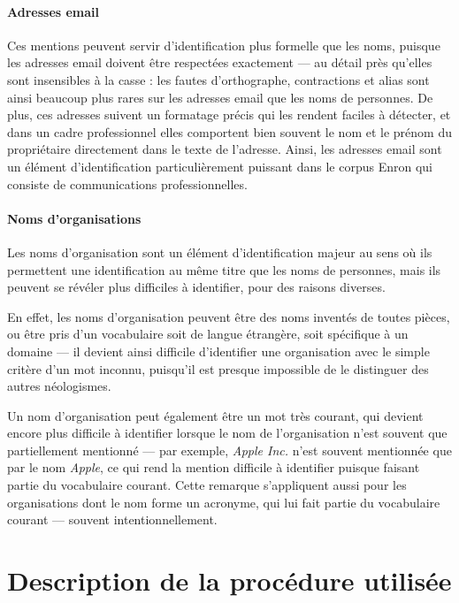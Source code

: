 \documentclass[11pt]{article}
\begin{document}
\paragraph{Adresses email}

Ces mentions peuvent servir d'identification plus formelle que les noms, puisque
les adresses email doivent être respectées exactement --- au détail près
qu'elles sont insensibles à la casse : les fautes d'orthographe, contractions
et alias sont ainsi beaucoup plus rares sur les adresses email que les noms
de personnes. De plus, ces adresses suivent un formatage précis qui les rendent
faciles à détecter, et dans un cadre professionnel elles comportent bien souvent
le nom et le prénom du propriétaire directement dans le texte de l'adresse.
Ainsi, les adresses email sont un élément d'identification particulièrement
puissant dans le corpus Enron qui consiste de communications professionnelles.

\paragraph{Noms d'organisations}

Les noms d'organisation sont un élément d'identification majeur au sens où ils
permettent une identification au même titre que les noms de personnes, mais ils
peuvent se révéler plus difficiles à identifier, pour des raisons diverses.

En effet, les noms d'organisation peuvent être des noms inventés de toutes
pièces, ou être pris d'un vocabulaire soit de langue étrangère, soit spécifique
à un domaine --- il devient ainsi difficile d'identifier une organisation avec
le simple critère d'un mot inconnu, puisqu'il est presque impossible de le
distinguer des autres néologismes.

Un nom d'organisation peut également être un mot très courant, qui devient
encore plus difficile à identifier lorsque le nom de l'organisation n'est
souvent que partiellement mentionné --- par exemple, \textit{Apple Inc.} n'est
souvent mentionnée que par le nom \textit{Apple}, ce qui rend la mention
difficile à identifier puisque faisant partie du vocabulaire courant. Cette
remarque s'appliquent aussi pour les organisations dont le nom forme un
acronyme, qui lui fait partie du vocabulaire courant --- souvent
intentionnellement.

\section{Description de la procédure utilisée}
\end{document}
